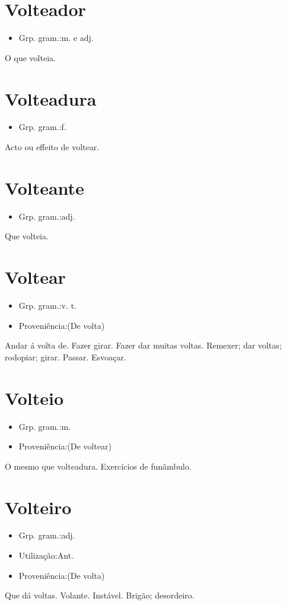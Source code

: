 \documentclass{article}
\begin{document}
\section{Volteador}
\begin{itemize}
\item {Grp. gram.:m.  e  adj.}
\end{itemize}
O que volteia.
\section{Volteadura}
\begin{itemize}
\item {Grp. gram.:f.}
\end{itemize}
Acto ou effeito de voltear.
\section{Volteante}
\begin{itemize}
\item {Grp. gram.:adj.}
\end{itemize}
Que volteia.
\section{Voltear}
\begin{itemize}
\item {Grp. gram.:v. t.}
\end{itemize}
\begin{itemize}
\item {Proveniência:(De \textunderscore volta\textunderscore )}
\end{itemize}
Andar á volta de.
Fazer girar.
Fazer dar muitas voltas.
Remexer; dar voltas; rodopiar; girar.
Passar.
Esvoaçar.
\section{Volteio}
\begin{itemize}
\item {Grp. gram.:m.}
\end{itemize}
\begin{itemize}
\item {Proveniência:(De \textunderscore voltear\textunderscore )}
\end{itemize}
O mesmo que \textunderscore volteadura\textunderscore .
Exercícios de funâmbulo.
\section{Volteiro}
\begin{itemize}
\item {Grp. gram.:adj.}
\end{itemize}
\begin{itemize}
\item {Utilização:Ant.}
\end{itemize}
\begin{itemize}
\item {Proveniência:(De \textunderscore volta\textunderscore )}
\end{itemize}
Que dá voltas.
Volante.
Instável.
Brigão; desordeiro.
\end{document}
